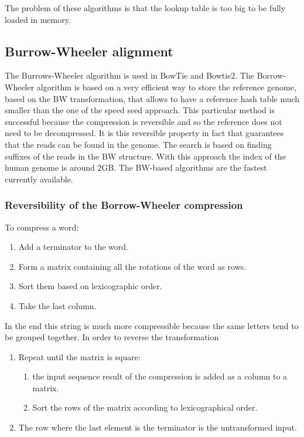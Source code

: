     The problem of these algorithms is that the lookup table is too big to be fully loaded in memory.

    \subsection{Burrow-Wheeler alignment}
    The Burrows-Wheeler algorithm is used in BowTie and Bowtie2.
    The Borrow-Wheeler algorithm is based on a very efficient way to store the reference genome, based on the BW transformation, that allows to have a reference hash table much smaller than the one of the speed seed approach.
    This particular method is successful because the compression is reversible and so the reference does not need to be decompressed.
    It is this reversible property in fact that guarantees that the reads can be found in the genome.
    The search is based on finding suffixes of the reads in the BW structure.
    With this approach the index of the human genome is around 2GB.
    The BW-based algorithms are the fastest currently available.

        \subsubsection{Reversibility of the Borrow-Wheeler compression}
        To compress a word:

        \begin{multicols}{2}
            \begin{enumerate}
                \item Add a terminator to the word.
                \item Form a matrix containing all the rotations of the word as rows.
                \item Sort them based on lexicographic order.
                \item Take the last column.
            \end{enumerate}
        \end{multicols}

        In the end this string is much more compressible because the same letters tend to be grouped together.
        In order to reverse the transformation

        \begin{multicols}{2}
            \begin{enumerate}
                \item Repeat until the matrix is square:
                    \begin{enumerate}
                        \item the input sequence result of the compression is added as a column to a matrix.
                        \item Sort the rows of the matrix according to lexicographical order.
                    \end{enumerate}
                \item The row where the last element is the terminator is the untransformed input.
            \end{enumerate}
        \end{multicols}

